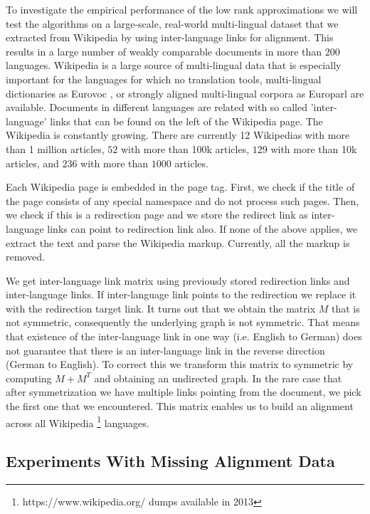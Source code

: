 \documentclass[twoside,11pt]{article}
\begin{document}
To investigate the empirical performance of the low rank approximations we will test the algorithms on a large-scale, real-world multi-lingual dataset that we extracted from Wikipedia by using inter-language links for alignment. This  results in a large number of weakly comparable documents in more than $200$ languages. Wikipedia is a large source of multi-lingual data that is especially important for the languages for which no translation tools, multi-lingual dictionaries as Eurovoc \cite{eurovoc}, or strongly aligned multi-lingual corpora as Europarl \cite{europarl} are available. Documents in different languages are related with so called 'inter-language' links that can be found on the left of the Wikipedia page. The Wikipedia is constantly growing. There are currently 12 Wikipedias with more than 1 million %
 articles, $52$ with more than 100k %
 articles, $129$ with more than 10k articles, and $236$ with more than $1000$ articles.

Each Wikipedia page is embedded in the page tag. First, we check if the title of the page consists of any special namespace and do not process such pages. Then, we check if this is a redirection page and we store the redirect link as inter-language links can point to redirection link also. If none of the above applies, we extract the text and parse the Wikipedia markup. Currently, all the markup is removed.

We get inter-language link matrix using previously stored redirection links and inter-language links. If inter-language link points to the redirection we replace it with the redirection target link. It turns out that we obtain the matrix $M$ that is not symmetric, consequently the underlying graph is not symmetric. That means that existence of the inter-language link in one way (i.e. English to German) does not guarantee that there is an inter-language link in the reverse direction (German to English). To correct this we transform this matrix to symmetric by computing $M+M^T$ and obtaining an undirected graph. In the rare case that after symmetrization we have multiple links pointing from the document, we pick the first one that we encountered. This matrix enables us to build an alignment across all Wikipedia \footnote{https://www.wikipedia.org/ dumps available in 2013} languages.

\subsection{Experiments With Missing Alignment Data}\label{experiments:hubcca}
\end{document}
